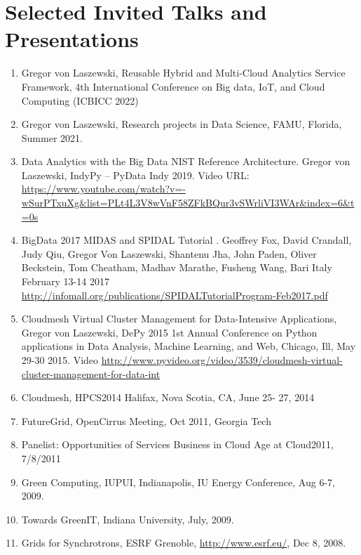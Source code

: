 \documentclass{article}
\begin{document}
\pbib






\section{Selected Invited Talks and Presentations} 

\begin{enumerate}

 \item Gregor von Laszewski, Reusable Hybrid and Multi-Cloud Analytics Service Framework,
4th International Conference on Big data, IoT, and Cloud Computing (ICBICC 2022)
\item Gregor von Laszewski, Research projects in Data Science, FAMU, Florida, Summer 2021.
\item  Data Analytics with the Big Data NIST Reference Architecture. Gregor von Laszewski, IndyPy – PyData Indy 2019. Video URL: \url{https://www.youtube.com/watch?v=-wSurPTxuXg&list=PLt4L3V8wVnF58ZFkBQur3vSWrliVI3WAr&index=6&t=0s}
\item  BigData 2017 MIDAS and SPIDAL Tutorial . Geoffrey Fox, David Crandall, Judy Qiu, Gregor Von Laszewski, Shantenu Jha, John Paden, Oliver Beckstein, Tom Cheatham, Madhav Marathe, Fusheng Wang, Bari Italy February 13-14 2017
\url{http://infomall.org/publications/SPIDALTutorialProgram-Feb2017.pdf}
\item  Cloudmesh Virtual Cluster Management for Data-Intensive Applications, Gregor von Laszewski, DePy 2015 1st Annual Conference on Python applications in Data Analysis, Machine Learning, and Web, Chicago, Ill, May 29-30 2015. Video \url{http://www.pyvideo.org/video/3539/cloudmesh-virtual-cluster-management-for-data-int}
\item  Cloudmesh, HPCS2014 Halifax, Nova Scotia, CA, June 25- 27, 2014
\item  FutureGrid, OpenCirrus Meeting, Oct 2011, Georgia Tech
\item  Panelist: Opportunities of Services Business in Cloud Age at Cloud2011, 7/8/2011 
\item  Green Computing,  IUPUI, Indianapolis, IU Energy Conference, Aug 6-7, 2009.
\item  Towards GreenIT, Indiana University, July, 2009. 
\item  Grids for Synchrotrons, ESRF Grenoble, \url{http://www.esrf.eu/}, Dec 8, 2008. 

\end{enumerate}
\end{document}
